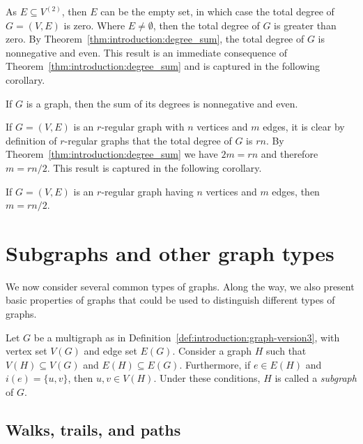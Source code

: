 As $E \subseteq V^{(2)}$, then $E$ can be the empty set, in which
case the total degree of $G = (V, E)$ is zero. Where $E \neq
\emptyset$, then the total degree of $G$ is greater than zero. By
Theorem~\ref{thm:introduction:degree_sum}, the total degree of $G$ is
nonnegative and even. This result is an immediate consequence of
Theorem~\ref{thm:introduction:degree_sum} and is captured in the
following corollary.

\begin{corollary}
\label{cor:introduction:degree_sum_even}
If $G$ is a graph, then the sum of its degrees is nonnegative
and even.
\end{corollary}

If $G = (V, E)$ is an $r$-regular graph with $n$ vertices and $m$
edges, it is clear by definition of $r$-regular graphs that the total
degree of $G$ is $rn$. By Theorem~\ref{thm:introduction:degree_sum} we
have $2m = rn$ and therefore $m = rn / 2$. This result is captured in
the following corollary.

\begin{corollary}
If $G = (V, E)$ is an $r$-regular graph having $n$ vertices and $m$
edges, then $m = rn / 2$.
\end{corollary}



\section{Subgraphs and other graph types}
\label{sec:introduction:subgraphs_graph_types}

We now consider several common types of graphs. Along the way, we also
present basic properties of graphs that could be used to distinguish
different types of graphs.

Let $G$ be a multigraph as in
Definition~\ref{def:introduction:graph-version3}, with vertex set
$V(G)$ and edge set $E(G)$. Consider a graph $H$ such that
$V(H) \subseteq V(G)$ and $E(H) \subseteq E(G)$. Furthermore, if
$e \in E(H)$ and $i(e) = \{u,v\}$, then $u,v \in V(H)$. Under these
conditions, $H$ is called a \emph{subgraph} of $G$.



\subsection{Walks, trails, and paths}
\label{subsec:introduction:walks_trails_paths}

